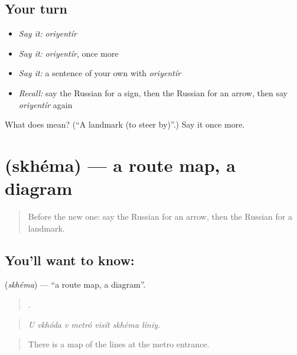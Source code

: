 \subsection*{Your turn}
\begin{itemize}
\raggedright
  \item \emph{Say it:} \emph{oriyentír}
  \item \emph{Say it:} \emph{oriyentír}, once more
  \item \emph{Say it:} a sentence of your own with \emph{oriyentír}
  \item \emph{Recall:} say the Russian for a sign, then the Russian for an arrow, then say \emph{oriyentír} again
\end{itemize}

\begin{tcolorbox}[breakable,colback=teal!4,colframe=teal!35!black,title={Before you move on}]
What does  mean? (\textquotedblleft{}A landmark (to steer by)\textquotedblright{}.) Say it once more.
\end{tcolorbox}
\section[\texorpdfstring{\ru{схема} (skhéma)}{схема (skhéma)}]{ (skhéma) — a route map, a diagram}

\label{lesson:RU-C438-skhema}



\begin{quote}
Before the new one: say the Russian for an arrow, then the Russian for a landmark.
\end{quote}

\subsection*{You'll want to know: }
\textbf{} (\emph{skhéma}) — \textquotedblleft{}a route map, a diagram\textquotedblright{}.

\begin{quote}
      .
\end{quote}

\begin{quote}
\emph{U vkhóda v metró visít skhéma líniy.}
\end{quote}

\begin{quote}
There is a map of the lines at the metro entrance.
\end{quote}

